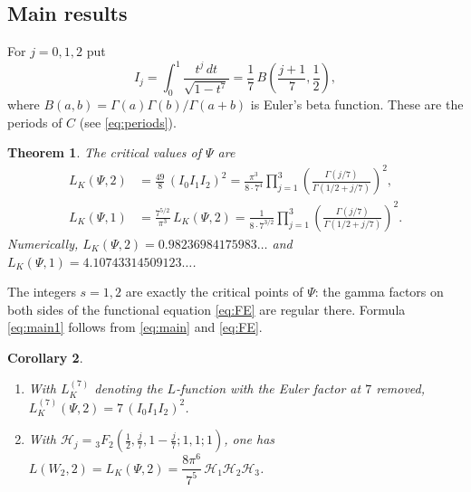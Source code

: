 \documentclass[11pt]{amsart}
\newtheorem{theorem}{Theorem}[section]
\newtheorem{corollary}[theorem]{Corollary}
\theoremstyle{remark}
\theoremstyle{definition}
\begin{document}
\subsection{Main results}
For $j=0,1,2$ put
\[
I_j=\int_0^1\frac{t^{j}\,dt}{\sqrt{1-t^7}}=\frac17\,B\!\left(\frac{j+1}{7},\frac12\right),
\]
where $B(a,b)=\Gamma(a)\Gamma(b)/\Gamma(a+b)$ is Euler's beta function. These are the periods of $C$ (see \eqref{eq:periods}).

\begin{theorem}\label{thm:main}
The critical values of $\Psi$ are
\begin{align}
L_K(\Psi,2)&=\frac{49}{8}\,(I_0I_1I_2)^2=\frac{\pi^3}{8\cdot7^4}\prod_{j=1}^{3}\left(\frac{\Gamma(j/7)}{\Gamma(1/2+j/7)}\right)^{2},\label{eq:main}\\
L_K(\Psi,1)&=\frac{7^{5/2}}{\pi^{3}}\,L_K(\Psi,2)=\frac{1}{8\cdot7^{3/2}}\prod_{j=1}^{3}\left(\frac{\Gamma(j/7)}{\Gamma(1/2+j/7)}\right)^{2}.\label{eq:main1}
\end{align}
Numerically, $L_K(\Psi,2)=0.98236984175983\ldots$ and $L_K(\Psi,1)=4.10743314509123\ldots$.
\end{theorem}

The integers $s=1,2$ are exactly the critical points of $\Psi$: the gamma factors on both sides of the functional equation \eqref{eq:FE} are regular there. Formula \eqref{eq:main1} follows from \eqref{eq:main} and \eqref{eq:FE}.

\begin{corollary}\label{cor:variants}
\begin{enumerate}
\item With $L_K^{(7)}$ denoting the $L$-function with the Euler factor at $7$ removed, $L^{(7)}_K(\Psi,2)=7\,(I_0I_1I_2)^2$.
\item With $\mathcal H_j={}_3F_2\!\left(\tfrac12,\tfrac j7,1-\tfrac j7;1,1;1\right)$, one has $L(W_2,2)=L_K(\Psi,2)=\dfrac{8\pi^6}{7^5}\,\mathcal H_1\mathcal H_2\mathcal H_3$.
\end{enumerate}
\end{corollary}
\end{document}

